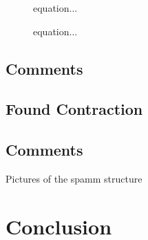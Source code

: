 \documentclass[letterpaper,twocolumn,amsmath,amsfont,amssymb,english,aps,jcp,preprintnumbers,groupaddress,nofootinbib,tightenlines]{revtex4}
\begin{document}
\begin{figure}[h]
  \caption{equation...}
\end{figure}

\begin{figure}[h]
  \caption{equation...}
\end{figure}





\subsection{Comments}

\subsection{Found Contraction}

\subsection{Comments}
Pictures of the spamm structure

\section{Conclusion}



\end{document}

